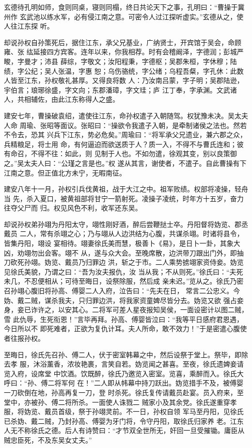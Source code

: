 玄德待孔明如师，食则同桌，寝则同榻，终日共论天下之事，孔明曰：“曹操于冀州作
玄武池以练水军，必有侵江南之意。可密令人过江探听虚实。”玄德从之，使人往江东探
听。

却说孙权自孙策死后，据住江东，承父兄基业，广纳贤士，开宾馆于吴会，命顾雍、张
纮延接四方宾客。连年以来，你我相荐。时有会稽阚泽，字德润；彭城严畯，字曼才；沛县
薛综，字敬文；汝阳程秉，字德枢；吴郡朱桓，字休穆；陆绩，字公纪；吴人张温，字惠
恕；乌伤骆统，字公绪；乌程吾粲，字孔休：此数人皆至江东，孙权敬礼甚厚。又得良将数
人：乃汝南吕蒙，字子明；吴郡陆逊，宇伯言；琅琊徐盛，字文向；东郡潘璋，字文珪；庐
江丁奉，字承渊。文武诸人，共相辅佐，由此江东称得人之盛。

建安七年，曹操破袁绍，遣使往江东，命孙权遣子入朝随驾。权犹豫未决。吴太夫人命
周瑜、张昭等面议。张昭曰：“操欲令我遣子入朝，是牵制诸侯之法也。然若不令去，恐其
兴兵下江东，势必危矣。”周瑜曰：“将军承父兄遗业，兼六郡之众，兵精粮足，将士用
命，有何逼迫而欲送质于人？质一入，不得不与曹氏连和；彼有命召，不得不往：如此，则
见制于人也。不如勿遣，徐观其变，别以良策御之。”吴太夫人曰：“公瑾之言是也。”权
遂从其言，谢使者，不遣子。自此曹操有下江南之意。但正值北方未宁，无暇南征。

建安八年十一月，孙权引兵伐黄祖，战于大江之中。祖军败绩。权部将凌操，轻舟当
先，杀入夏口，被黄祖部将甘宁一箭射死。凌操子凌统，时年方十五岁，奋力往夺父尸而
归。权见风色不利，收军还东吴。

却说孙权弟孙翊为丹阳太守，翊性刚好酒，醉后尝鞭挞士卒。丹阳督将妫览、郡丞戴员
二人，常有杀翊之心；乃与翊从人边洪结为心腹，共谋杀翊。时诸将县令，皆集丹阳，翊设
宴相待。翊妻徐氏美而慧，极善卜《易》，是日卜一卦，其象大凶，劝翊勿出会客。翊不
从，遂与众大会。至晚席散，边洪带刀跟出门外，即抽刀砍死孙翊。妫览、戴员乃归罪边
洪，斩之于市。二人乘势掳翊家资侍妾。妫览见徐氏美貌，乃谓之曰：“吾为汝夫报仇，汝
当从我；不从则死。”徐氏曰：“夫死未几，不忍便相从；可待至晦日，设祭除服，然后成
亲未迟。”览从之。徐氏乃密召孙翊心腹旧将孙高、傅婴二人入府，泣告曰：“先夫在日，
常言二公忠义。今妫、戴二贼，谋杀我夫，只归罪边洪，将我家资童婢尽皆分去。妫览又欲
强占妾身，妾已诈许之，以安其心。二将军可差人星夜报知吴侯，一面设密计以图二贼，雪
此仇辱，生死衔恩！”言毕再拜。孙高、傅婴皆泣曰：“我等平日感府君恩遇，今日所以不
即死难者，正欲为复仇计耳。夫人所命，敢不效力！”于是密遣心腹使者往报孙权。

至晦日，徐氏先召孙、傅二人，伏于密室韩幕之中，然后设祭于堂上。祭毕，即除去孝
服，沐浴薰香，浓妆艳裹，言笑自若。妫览闻之甚喜。至夜，徐氏遗婢妾请览入府，设席堂
中饮酒。饮既醉，徐氏乃邀览入密室。览喜，乘醉而入。徐氏大呼曰：“孙、傅二将军何
在！”二人即从帏幕中持刀跃出。妫览措手不及，被傅婴一刀砍倒在地，孙高再复一刀，登
时杀死。徐氏复传请戴员赴宴。员入府来，至堂中，亦被孙、傅二将所杀。一面使人诛戮二
贼家小及其余党。徐氏遂重穿孝服，将妫览、戴员首级，祭于孙翊灵前。不一日，孙权自领
军马至丹阳，见徐氏已杀妫、戴二贼，乃封孙高、傅婴为牙门将，令守丹阳，取徐氏归家养
老。江东人无不称徐氏之德。后人有诗赞曰：“才节双全世所无，奸回一旦受摧锄。庸臣从
贼忠臣死，不及东吴女丈夫。”

